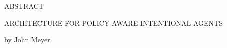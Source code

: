 \documentclass[12pt, oneside]{book2}
\newcommand{\documentTitle}{ARCHITECTURE FOR POLICY-AWARE INTENTIONAL AGENTS}
\newcommand{\documentAuthor}{John Meyer}
\theoremstyle{definition}
\begin{document}
\thispagestyle{empty}
\singlespacing

\begin{center}

    ABSTRACT

    \vspace{2.0cm}

    \documentTitle

    \vspace{1.0cm}

    by \documentAuthor

    \vspace{1.0cm}

\end{center}

\noindent


\newpage

\thispagestyle{empty}

\frontmatter

\doublespacing
\end{document}
